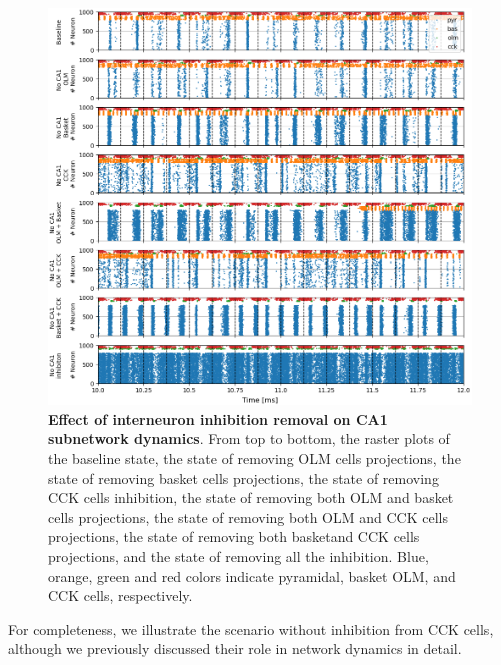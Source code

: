 \documentclass[../main.tex]{subfiles}
\begin{document}
\begin{figure}[htpb]
    \centering
    \includegraphics[width=\textwidth]{chapter4/figures/removing_interneurons/removing_interneurons_ca1_v4_rasters_new.png}
    \caption{\textbf{Effect of interneuron inhibition removal on CA1 subnetwork dynamics}.
    From top to bottom, the raster plots of the baseline state, the state of removing OLM cells projections, the state of removing basket cells projections, the state of removing CCK cells inhibition, the state of removing both OLM and basket cells projections, the state of removing both OLM and CCK cells projections, the state of removing both basketand CCK cells projections, and the state of removing all the inhibition.
    Blue, orange, green and red colors indicate pyramidal, basket OLM, and CCK cells, respectively.}
    \label{fig:interneurons-ca1-2-rasters}
\end{figure}
For completeness, we illustrate the scenario without inhibition from CCK cells, although we previously discussed their role in network dynamics in detail.

\end{document}
